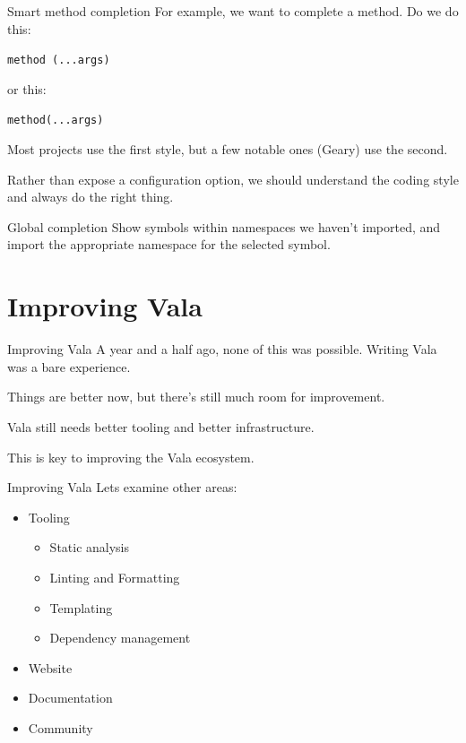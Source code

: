 \documentclass[t]{beamer}
\begin{document}
\begin{frame}[c]{Smart method completion}
    For example, we want to complete a method. Do we do this:
    
    \texttt{method (...args)}
    
    or this:
    
    \texttt{method(...args)}
    
    Most projects use the first style, but a few notable ones (Geary) use the second.
    
    Rather than expose a configuration option, we should understand the coding style and always do the right thing.
\end{frame}

\begin{frame}[c]{Global completion}
    Show symbols within namespaces we haven't imported, and import the appropriate namespace for the selected symbol.
\end{frame}


\section{Improving Vala}
\begin{frame}[c]{Improving Vala}
    A year and a half ago, none of this was possible. Writing Vala was a bare experience. 
    
    Things are better now, but there's still much room for improvement.
    
    Vala still needs better tooling and better infrastructure.
    
    This is key to improving the Vala ecosystem.
\end{frame}

\begin{frame}[c]{Improving Vala}
    Lets examine other areas:
    \begin{itemize}
        \item Tooling
        \begin{itemize}
            \item Static analysis
            \item Linting and Formatting
            \item Templating
            \item Dependency management
        \end{itemize}
        \item Website
        \item Documentation
        \item Community
    \end{itemize}
\end{frame}
\end{document}
